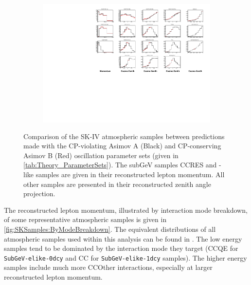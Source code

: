 \begin{figure}
  \centering
  \begin{subfigure}[t]{\textwidth}
    \includegraphics[width=\textwidth, trim={0mm 0mm 0mm 0mm}, clip,page=1]{Figures/Selections/HistogramComparison.pdf}
  \end{subfigure}
  \caption{Comparison of the SK-IV atmospheric samples between predictions made with the CP-violating Asimov A (Black) and CP-conserving Asimov B (Red) oscillation parameter sets (given in \autoref{tab:Theory_ParameterSets}). The subGeV samples CCRES and -like samples are given in their reconstructed lepton momentum. All other samples are presented in their reconstructed zenith angle projection.}
  \label{fig:SelsAndSysts_AllSampleComparison}
\end{figure}

The reconstructed lepton momentum, illustrated by interaction mode breakdown, of some representative atmospheric samples is given in \autoref{fig:SKSamples:ByModeBreakdown}. The equivalent distributions of all atmospheric samples used within this analysis can be found in \cite{t2k_tn_422}. The low energy samples tend to be dominated by the interaction mode they target (CCQE for \texttt{SubGeV-elike-0dcy} and CC\quickmath{1\pi} for \texttt{SubGeV-elike-1dcy} samples). The higher energy samples include much more CCOther interactions, especially at larger reconstructed lepton momentum.

